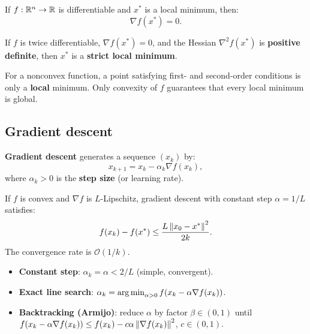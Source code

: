 \begin{theorem}
If $f : \mathbb{R}^n \to \mathbb{R}$ is differentiable and $x^*$ is a local minimum, then:
\[
  \nabla f(x^*) = 0.
\]
\end{theorem}

\begin{theorem}
If $f$ is twice differentiable, $\nabla f(x^*) = 0$, and the Hessian
$\nabla^2 f(x^*)$ is \textbf{positive definite}, then $x^*$ is a
\textbf{strict local minimum}.
\end{theorem}

\begin{warning}[title=\textbf{Local vs.\ global minima}]
For a nonconvex function, a point satisfying first- and second-order
conditions is only a \textbf{local} minimum. Only convexity of $f$ guarantees
that every local minimum is global.
\end{warning}

\subsection{Gradient descent}

\begin{definition}
\textbf{Gradient descent} generates a sequence $(x_k)$ by:
\[
  x_{k+1} = x_k - \alpha_k \nabla f(x_k),
\]
where $\alpha_k > 0$ is the \textbf{step size} (or learning rate).
\end{definition}

\begin{theorem}
If $f$ is convex and $\nabla f$ is $L$-Lipschitz, gradient descent with
constant step $\alpha = 1/L$ satisfies:
\[
  f(x_k) - f(x^*) \leq \frac{L \left\| x_0 - x^* \right\|^2}{2k}.
\]
The convergence rate is $\mathcal{O}(1/k)$.
\end{theorem}

\begin{keyformulas}[title=\textbf{Step size selection}]
\begin{itemize}
  \item \textbf{Constant step}: $\alpha_k = \alpha < 2/L$ (simple,
        convergent).
  \item \textbf{Exact line search}:
        $\alpha_k = \operatorname*{arg\,min}_{\alpha > 0} f(x_k - \alpha \nabla f(x_k))$.
  \item \textbf{Backtracking (Armijo)}: reduce $\alpha$ by factor
        $\beta \in (0,1)$ until
        $f(x_k - \alpha \nabla f(x_k)) \leq f(x_k) -
        c \alpha \left\| \nabla f(x_k) \right\|^2$, $c \in (0,1)$.
\end{itemize}
\end{keyformulas}

